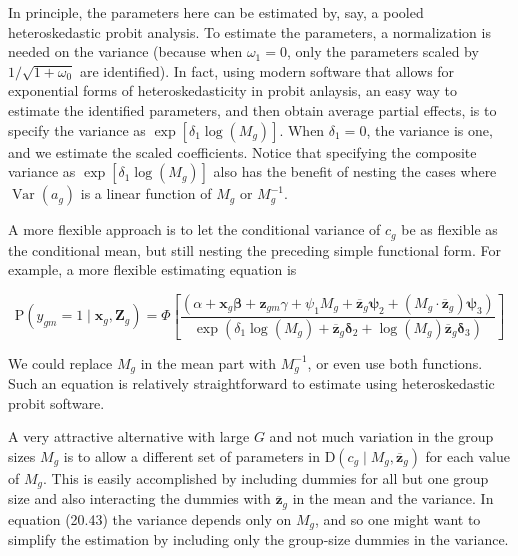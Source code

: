 \documentclass[10pt]{article}
\begin{document}
In principle, the parameters here can be estimated by, say, a pooled heteroskedastic probit analysis. To estimate the parameters, a normalization is needed on the variance (because when $\omega_{1}=0$, only the parameters scaled by $1 / \sqrt{1+\omega_{0}}$ are identified). In fact, using modern software that allows for exponential forms of heteroskedasticity in probit anlaysis, an easy way to estimate the identified parameters, and then obtain average partial effects, is to specify the variance as $\exp \left[\delta_{1} \log \left(M_{g}\right)\right]$. When $\delta_{1}=0$, the variance is one, and we estimate the scaled coefficients. Notice that specifying the composite variance as $\exp \left[\delta_{1} \log \left(M_{g}\right)\right]$ also has the benefit of nesting the cases where $\operatorname{Var}\left(a_{g}\right)$ is a linear function of $M_{g}$ or $M_{g}^{-1}$.

A more flexible approach is to let the conditional variance of $c_{g}$ be as flexible as the conditional mean, but still nesting the preceding simple functional form. For example, a more flexible estimating equation is


\begin{equation*}
\mathrm{P}\left(y_{g m}=1 \mid \mathbf{x}_{g}, \mathbf{Z}_{g}\right)=\Phi\left[\frac{\left(\alpha+\mathbf{x}_{g} \boldsymbol{\beta}+\mathbf{z}_{g m} \gamma+\psi_{1} M_{g}+\overline{\mathbf{z}}_{g} \boldsymbol{\psi}_{2}+\left(M_{g} \cdot \overline{\mathbf{z}}_{g}\right) \boldsymbol{\psi}_{3}\right)}{\exp \left(\delta_{1} \log \left(M_{g}\right)+\overline{\mathbf{z}}_{g} \boldsymbol{\delta}_{2}+\log \left(M_{g}\right) \overline{\mathbf{z}}_{g} \boldsymbol{\delta}_{3}\right)}\right] \tag{20.47}
\end{equation*}


We could replace $M_{g}$ in the mean part with $M_{g}^{-1}$, or even use both functions. Such an equation is relatively straightforward to estimate using heteroskedastic probit software.

A very attractive alternative with large $G$ and not much variation in the group sizes $M_{g}$ is to allow a different set of parameters in $\mathrm{D}\left(c_{g} \mid M_{g}, \overline{\mathbf{z}}_{g}\right)$ for each value of $M_{g}$. This is easily accomplished by including dummies for all but one group size and also interacting the dummies with $\overline{\mathbf{z}}_{g}$ in the mean and the variance. In equation (20.43) the variance depends only on $M_{g}$, and so one might want to simplify the estimation by including only the group-size dummies in the variance.
\end{document}
